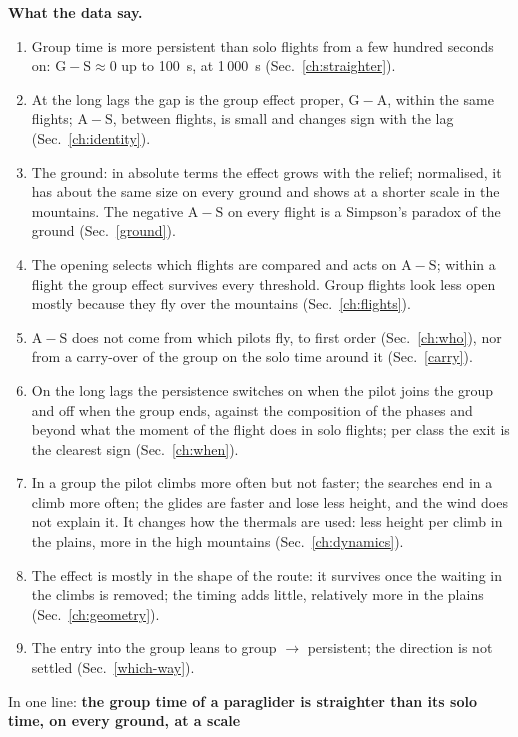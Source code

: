 \documentclass[10pt,a4paper]{article}
\newcommand{\G}{\mathrm{G}}
\newcommand{\A}{\mathrm{A}}
\newcommand{\Sl}{\mathrm{S}}
\newcommand{\Home}{\item[\textcolor{answer}{\textbf{Take home.}}]\color{black}}
\newenvironment{step}{\begin{description}[leftmargin=0pt, itemsep=7pt, topsep=8pt]}{\end{description}}
\begin{document}
\begin{step}
\Home \textbf{What the data say.}
  \begin{enumerate}
  \item Group time is more persistent than solo flights from a few hundred seconds on: $\G-\Sl\approx0$ up to
    100~s, \ChainGSThousand{} at 1\,000~s (Sec.~\ref{ch:straighter}).
  \item At the long lags the gap is the group effect proper, $\G-\A$, within the same flights; $\A-\Sl$, between
    flights, is small and changes sign with the lag (Sec.~\ref{ch:identity}).
  \item The ground: in absolute terms the effect grows with the relief; normalised, it has about the same size on
    every ground and shows at a shorter scale in the mountains. The negative $\A-\Sl$ on every flight is a Simpson's
    paradox of the ground (Sec.~\ref{ground}).
  \item The opening selects which flights are compared and acts on $\A-\Sl$; within a flight the group effect
    survives every threshold. Group flights look less open mostly because they fly over the mountains
    (Sec.~\ref{ch:flights}).
  \item $\A-\Sl$ does not come from which pilots fly, to first order (Sec.~\ref{ch:who}), nor from a carry-over of
    the group on the solo time around it (Sec.~\ref{carry}).
  \item On the long lags the persistence switches on when the pilot joins the group and off when the group ends,
    against the composition of the phases and beyond what the moment of the flight does in solo flights; per class
    the exit is the clearest sign (Sec.~\ref{ch:when}).
  \item In a group the pilot climbs more often but not faster; the searches end in a climb more often; the glides
    are faster and lose less height, and the wind does not explain it. It changes how the thermals are used: less
    height per climb in the plains, more in the high mountains (Sec.~\ref{ch:dynamics}).
  \item The effect is mostly in the shape of the route: it survives once the waiting in the climbs is removed; the
    timing adds little, relatively more in the plains (Sec.~\ref{ch:geometry}).
  \item The entry into the group leans to group $\to$ persistent; the direction is not settled (Sec.~\ref{which-way}).
  \end{enumerate}
  In one line: \textbf{the group time of a paraglider is straighter than its solo time, on every ground, at a scale
}
\end{step}
\end{document}
